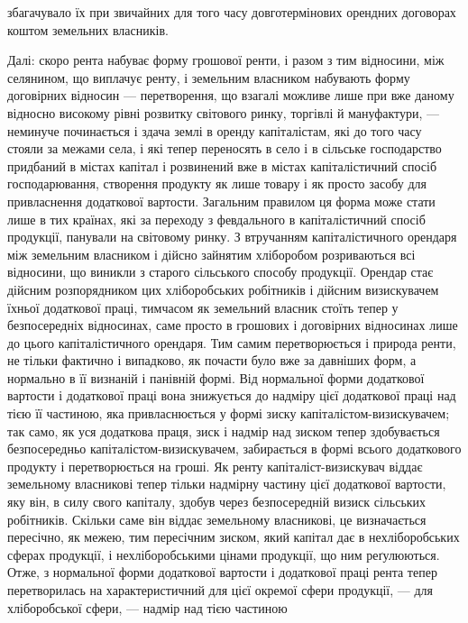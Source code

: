 \parcont{}  %
збагачувало їх при звичайних для того часу довготермінових орендних договорах
коштом земельних власників.

Далі: скоро рента набуває форму грошової ренти, і разом з тим відносини,
між селянином, що виплачує ренту, і земельним власником набувають форму
договірних відносин — перетворення, що взагалі можливе лише при вже даному
відносно високому рівні розвитку світового ринку, торгівлі й мануфактури, —
неминуче починається і здача землі в оренду капіталістам, які до того часу
стояли за межами села, і які тепер переносять в село і в сільське господарство
придбаний в містах капітал і розвинений вже в містах капіталістичний спосіб
господарювання, створення продукту як лише товару і як просто засобу для
привласнення додаткової вартости. Загальним правилом ця форма може стати
лише в тих країнах, які за переходу з февдального в капіталістичний спосіб
продукції, панували на світовому ринку. З втручанням капіталістичного орендаря
між земельним власником і дійсно зайнятим хліборобом розриваються всі
відносини, що виникли з старого сільського способу продукції. Орендар стає
дійсним розпорядником цих хліборобських робітників і дійсним визискувачем
їхньої додаткової праці, тимчасом як земельний власник стоїть тепер
у безпосередніх відносинах, саме просто в грошових і договірних відносинах
лише до цього капіталістичного орендаря. Тим самим перетворюється
і природа ренти, не тільки фактично і випадково, як почасти було вже за
давніших форм, а нормально в її визнаній і панівній формі. Від нормальної
форми додаткової вартости і додаткової праці вона знижується до надміру цієї
додаткової праці над тією її частиною, яка привласнюється у формі зиску
капіталістом-визискувачем; так само, як уся додаткова праця, зиск і надмір
над зиском тепер здобувається безпосередньо капіталістом-визискувачем, забирається
в формі всього додаткового продукту і перетворюється на гроші. Як
ренту капіталіст-визискувач віддає земельному власникові тепер тільки надмірну
частину цієї додаткової вартости, яку він, в силу свого капіталу, здобув
через безпосередній визиск сільських робітників. Скільки саме він віддає земельному
власникові, це визначається пересічно, як межею, тим пересічним
зиском, який капітал дає в нехліборобських сферах продукції, і нехліборобськими
цінами продукції, що ним реґулюються. Отже, з нормальної форми додаткової
вартости і додаткової праці рента тепер перетворилась на характеристичний для цієї
окремої сфери продукції, — для хліборобської сфери, — надмір над тією частиною
